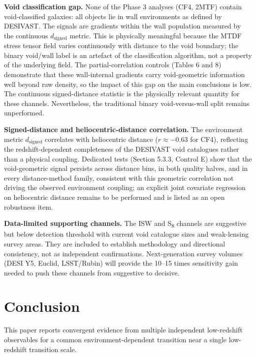 \documentclass[11pt,a4paper]{article}
\begin{document}
\textbf{Void classification gap.} None of the Phase 3 analyses (CF4, 2MTF) contain void-classified galaxies: all objects lie in wall environments as defined by DESIVAST. The signals are gradients within the wall population measured by the continuous \(d_\mathrm{signed}\) metric. This is physically meaningful because the MTDF stress tensor field varies continuously with distance to the void boundary; the binary void/\allowbreak{}wall label is an artefact of the classification algorithm, not a property of the underlying field. The partial-correlation controls (Tables 6 and 8) demonstrate that these wall-internal gradients carry void-geometric information well beyond raw density, so the impact of this gap on the main conclusions is low. The continuous signed-distance statistic is the physically relevant quantity for these channels. Nevertheless, the traditional binary void-versus-wall split remains unperformed.

\textbf{Signed-distance and heliocentric-distance correlation.} The environment metric \(d_\mathrm{signed}\) correlates with heliocentric distance (\(r \approx -0.63\) for CF4), reflecting the redshift-dependent completeness of the DESIVAST void catalogues rather than a physical coupling. Dedicated tests (Section 5.3.3, Control E) show that the void-geometric signal persists across distance bins, in both quality halves, and in every distance-method family, consistent with this geometric correlation not driving the observed environment coupling; an explicit joint covariate regression on heliocentric distance remains to be performed and is listed as an open robustness item.

\textbf{Data-limited supporting channels.} The ISW and S\textsubscript{8} channels are suggestive but below detection threshold with current void catalogue sizes and weak-lensing survey areas. They are included to establish methodology and directional consistency, not as independent confirmations. Next-generation survey volumes (DESI Y5, Euclid, LSST/\allowbreak{}Rubin) will provide the 10--15 times sensitivity gain needed to push these channels from suggestive to decisive.

\section{Conclusion}
\label{sec:sec10}
This paper reports convergent evidence from multiple independent low-redshift observables for a common environment-dependent transition near a single low-redshift transition scale.
\end{document}
